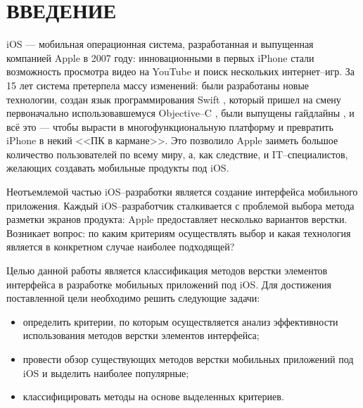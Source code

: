 \section*{ВВЕДЕНИЕ}

iOS \cite{ios} --- мобильная операционная система, разработанная и выпущенная компанией Apple \cite{apple} в 2007 году: инновационными в первых iPhone \cite{iphone} стали возможность просмотра видео на YouTube \cite{youtube} и поиск нескольких интернет--игр. За 15 лет система претерпела массу изменений: были разработаны новые технологии, создан язык программирования Swift \cite{swift}, который пришел на смену первоначально использовавшемуся Objective--C \cite{objc}, были выпущены гайдлайны \cite{hig}, и всё это --- чтобы вырасти в многофункциональную платформу и превратить iPhone в некий <<ПК в кармане>>. Это позволило Apple заиметь большое количество пользователей по всему миру, а, как следствие, и IT--специалистов, желающих создавать мобильные продукты под iOS. 

Неотъемлемой частью iOS--разработки является создание интерфейса мобильного приложения. Каждый iOS--разработчик сталкивается с проблемой выбора метода разметки экранов продукта: Apple предоставляет несколько вариантов верстки. Возникает вопрос: по каким критериям осуществлять выбор и какая технология является в конкретном случае наиболее подходящей?

Целью данной работы является классификация методов верстки элементов интерфейса в разработке мобильных приложений под iOS. Для достижения поставленной цели необходимо решить следующие задачи: 

\begin{itemize}[label=---]
	\item определить критерии, по которым осуществляется анализ эффективности использования методов верстки элементов интерфейса;
	\item провести обзор существующих методов верстки мобильных приложений под iOS и выделить наиболее популярные;
	\item классифицировать методы на основе выделенных критериев.
\end{itemize}
\pagebreak